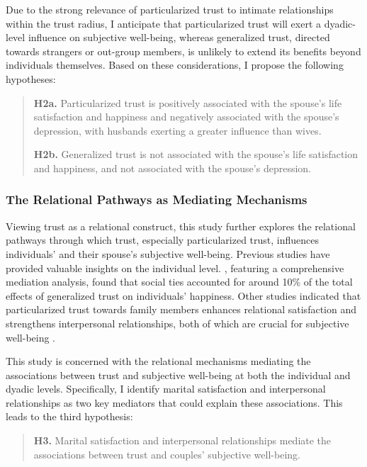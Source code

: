 Due to the strong relevance of particularized trust to intimate relationships within the trust radius, I anticipate that particularized trust will exert a dyadic-level influence on subjective well-being, whereas generalized trust, directed towards strangers or out-group members, is unlikely to extend its benefits beyond individuals themselves. Based on these considerations, I propose the following hypotheses:

\begin{quote}
    \textbf{H2a.} Particularized trust is positively associated with the spouse's life satisfaction and happiness and negatively associated with the spouse's depression, with husbands exerting a greater influence than wives.

    \textbf{H2b.} Generalized trust is not associated with the spouse's life satisfaction and happiness, and not associated with the spouse's depression.
\end{quote}

\subsubsection{The Relational Pathways as Mediating Mechanisms}

Viewing trust as a relational construct, this study further explores the relational pathways through which trust, especially particularized trust, influences individuals' and their spouse's subjective well-being. Previous studies have provided valuable insights on the individual level. \textcite{luLongitudinalEvidenceSocial2019}, featuring a comprehensive mediation analysis, found that social ties accounted for around 10\% of the total effects of generalized trust on individuals' happiness. Other studies indicated that particularized trust towards family members enhances relational satisfaction and strengthens interpersonal relationships, both of which are crucial for subjective well-being \parencite{adilRoleTrustMarital2013,fitzpatrickAttachmentTrustSatisfaction2017,shekMaritalQualityPsychological1995,wongExaminationRelationshipTrust2002}.

This study is concerned with the relational mechanisms mediating the associations between trust and subjective well-being at both the individual and dyadic levels. Specifically, I identify marital satisfaction and interpersonal relationships as two key mediators that could explain these associations. This leads to the third hypothesis:

\begin{quote}
    \textbf{H3.} Marital satisfaction and interpersonal relationships mediate the associations between trust and couples' subjective well-being.
\end{quote}
